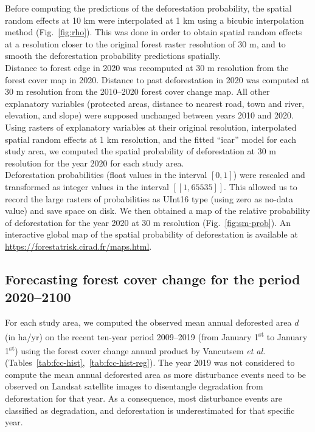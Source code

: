 \documentclass[
  12pt,
]{article}
\begin{document}
Before computing the predictions of the deforestation probability, the spatial random effects at 10 km were interpolated at 1 km using a bicubic interpolation method (Fig.~\ref{fig:rho}). This was done in order to obtain spatial random effects at a resolution closer to the original forest raster resolution of 30 m, and to smooth the deforestation probability predictions spatially.\\

Distance to forest edge in 2020 was recomputed at 30 m resolution from the forest cover map in 2020. Distance to past deforestation in 2020 was computed at 30 m resolution from the 2010--2020 forest cover change map. All other explanatory variables (protected areas, distance to nearest road, town and river, elevation, and slope) were supposed unchanged between years 2010 and 2020. Using rasters of explanatory variables at their original resolution, interpolated spatial random effects at 1 km resolution, and the fitted ``icar'' model for each study area, we computed the spatial probability of deforestation at 30 m resolution for the year 2020 for each study area.\\

Deforestation probabilities (float values in the interval \([0, 1]\)) were rescaled and transformed as integer values in the interval \([\![1, 65535]\!]\). This allowed us to record the large rasters of probabilities as UInt16 type (using zero as no-data value) and save space on disk. We then obtained a map of the relative probability of deforestation for the year 2020 at 30 m resolution (Fig.~\ref{fig:sm-prob}). An interactive global map of the spatial probability of deforestation is available at \url{https://forestatrisk.cirad.fr/maps.html}.

\hypertarget{forecasting-forest-cover-change-for-the-period-20202100}{%
\subsection{Forecasting forest cover change for the period 2020--2100}\label{forecasting-forest-cover-change-for-the-period-20202100}}

For each study area, we computed the observed mean annual deforested area \(d\) (in ha/yr) on the recent ten-year period 2009--2019 (from January 1\textsuperscript{st} to January 1\textsuperscript{st}) using the forest cover change annual product by Vancutsem \emph{et al.} \citep{Vancutsem2021} (Tables~\ref{tab:fcc-hist},~\ref{tab:fcc-hist-reg}). The year 2019 was not considered to compute the mean annual deforested area as more disturbance events need to be observed on Landsat satellite images to disentangle degradation from deforestation for that year. As a consequence, most disturbance events are classified as degradation, and deforestation is underestimated for that specific year.\\
\end{document}

